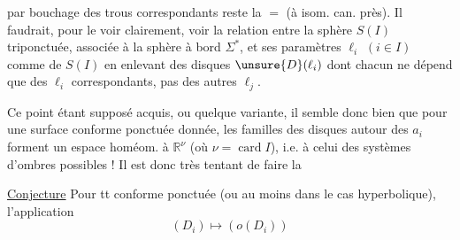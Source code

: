 par bouchage des trous correspondants reste
la $=$ (à isom. can. près). Il faudrait,
pour le voir clairement, voir la
relation entre la sphère  $S(I)$ triponctuée,
associée à la sphère à bord $\Sigma^*$, et ses
paramètres $\ell_i$ $(i\in I)$ comme 
de $S(I)$ en enlevant des disques 
$\unsure{D}(\ell_i)$  dont chacun ne dépend que
des $\ell_i$ correspondants, pas des autres
$\ell_j$.

Ce point étant supposé acquis, ou quelque
variante, il semble donc bien que
pour une surface conforme ponctuée
donnée,  les familles  des disques autour
des $a_i$ forment un espace homéom.
à $\mathbb R^\nu$ (où $\nu=\operatorname{card} I$), i.e. à celui
des systèmes d'ombres possibles ! Il
est donc très tentant de faire la

\uline{Conjecture} Pour tt  conforme
ponctuée (ou  au moins dans le cas
hyperbolique), l'application 
\[
(D_i)\longmapsto(o(D_i))
\]
